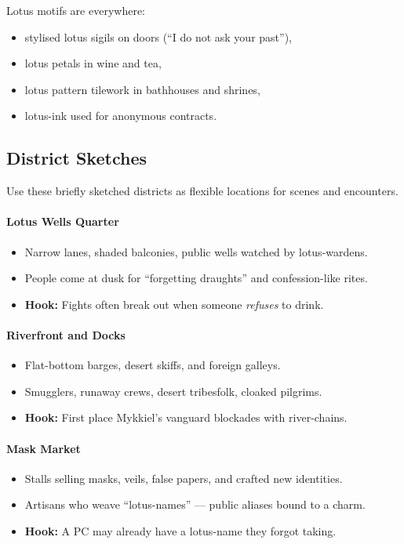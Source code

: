 \documentclass[11pt]{article}
\begin{document}
Lotus motifs are everywhere:
\begin{itemize}[leftmargin=*]
  \item stylised lotus sigils on doors (``I do not ask your past''),
  \item lotus petals in wine and tea,
  \item lotus pattern tilework in bathhouses and shrines,
  \item lotus-ink used for anonymous contracts.
\end{itemize}

\subsection*{District Sketches}

Use these briefly sketched districts as flexible locations for scenes and encounters.

\paragraph{Lotus Wells Quarter}
\begin{itemize}[leftmargin=*]
  \item Narrow lanes, shaded balconies, public wells watched by lotus-wardens.
  \item People come at dusk for ``forgetting draughts'' and confession-like rites.
  \item \textbf{Hook:} Fights often break out when someone \emph{refuses} to drink.
\end{itemize}

\paragraph{Riverfront and Docks}
\begin{itemize}[leftmargin=*]
  \item Flat-bottom barges, desert skiffs, and foreign galleys.
  \item Smugglers, runaway crews, desert tribesfolk, cloaked pilgrims.
  \item \textbf{Hook:} First place Mykkiel's vanguard blockades with river-chains.
\end{itemize}

\paragraph{Mask Market}
\begin{itemize}[leftmargin=*]
  \item Stalls selling masks, veils, false papers, and crafted new identities.
  \item Artisans who weave ``lotus-names'' --- public aliases bound to a charm.
  \item \textbf{Hook:} A PC may already have a lotus-name they forgot taking.
\end{itemize}
\end{document}
